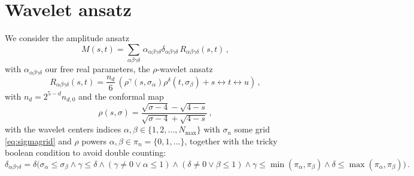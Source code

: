 \section*{Wavelet ansatz}
We consider the amplitude ansatz
\begin{equation}
M(s,t)=\sum_{\alpha\beta\gamma\delta}\,\alpha_{\alpha\beta\gamma\delta}\delta_{\alpha\beta\gamma\delta}\,R_{\alpha\beta\gamma\delta}(s,t)\,,
\end{equation}
with $\alpha_{\alpha\beta\gamma\delta}$ our free real parameters, the $\rho$-wavelet ansatz
\begin{equation}
R_{\alpha\beta\gamma\delta}(s,t)=\frac{n_d}{6}\,\left(\rho^\gamma(s,\sigma_\alpha)\rho^\delta(t,\sigma_\beta)+ s \leftrightarrow t \leftrightarrow u \right)\,, 
\end{equation}
with $n_d=2^{5-d}n_{d,0}$ and the conformal map 
\begin{equation}
\rho(s,\sigma)=\frac{\sqrt{\sigma-4}-\sqrt{4-s}}{\sqrt{\sigma-4}+\sqrt{4-s}}\,,
\label{eq:confmap}
\end{equation}
with the wavelet centers indices $\alpha,\beta\in \{1,2,...,N_{\mathrm{max}}\}$ with $\sigma_n$ some grid \eqref{eq:sigmagrid} and $\rho$ powers $\alpha,\beta\in \pi_n=\{0,1,...\}$, together with the tricky boolean condition to avoid double counting:
\begin{equation}
\delta_{\alpha\beta\gamma\delta}=\delta\big(
\sigma_\alpha\leq\sigma_\beta \land 
\gamma\leq \delta \land 
(\gamma\neq0 \lor \alpha\leq 1) \land 
(\delta\neq0 \lor \beta\leq 1) \land
\gamma\leq \min(\pi_\alpha,\pi_\beta) \land
\delta\leq \max(\pi_\alpha,\pi_\beta)
\big)\,.
\end{equation}




